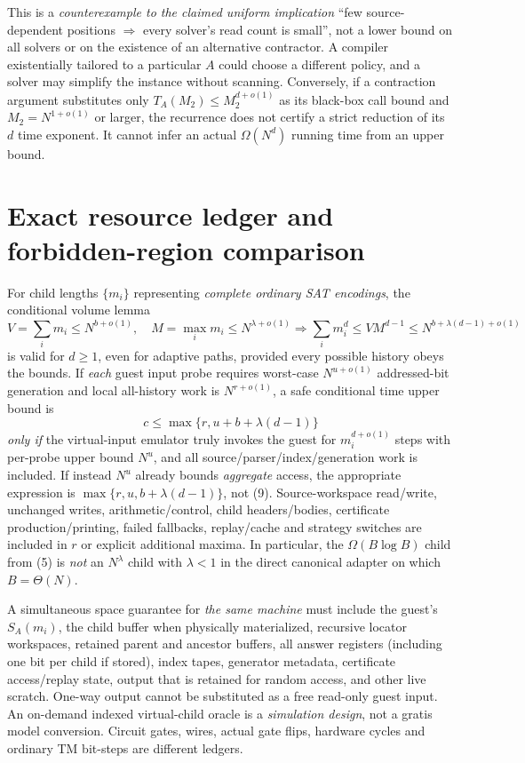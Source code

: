 \documentclass[11pt]{article}
\begin{document}
This is a \emph{counterexample to the claimed uniform implication} ``few source-dependent positions $\Longrightarrow$ every solver's read count is small'', not a lower bound on all solvers or on the existence of an alternative contractor. A compiler existentially tailored to a particular $A$ could choose a different policy, and a solver may simplify the instance without scanning. Conversely, if a contraction argument substitutes only $T_A(M_2)\le M_2^{d+o(1)}$ as its black-box call bound and $M_2=N^{1+o(1)}$ or larger, the recurrence does not certify a strict reduction of its $d$ time exponent. It cannot infer an actual $\Omega(N^d)$ running time from an upper bound.

\section{Exact resource ledger and forbidden-region comparison}
For child lengths $\{m_i\}$ representing \emph{complete ordinary SAT encodings}, the conditional volume lemma
\[
V=\sum_i m_i\le N^{b+o(1)},\quad M=\max_i m_i\le N^{\lambda+o(1)}
\Longrightarrow\sum_i m_i^d\le VM^{d-1}\le N^{b+\lambda(d-1)+o(1)}\tag{8}
\]
is valid for $d\ge1$, even for adaptive paths, provided every possible history obeys the bounds. If \emph{each} guest input probe requires worst-case $N^{u+o(1)}$ addressed-bit generation and local all-history work is $N^{r+o(1)}$, a safe conditional time upper bound is
\[
 c\le\max\{r,u+b+\lambda(d-1)\}\tag{9}
\]
\emph{only if} the virtual-input emulator truly invokes the guest for $m_i^{d+o(1)}$ steps with per-probe upper bound $N^u$, and all source/parser/index/generation work is included. If instead $N^u$ already bounds \emph{aggregate} access, the appropriate expression is $\max\{r,u,b+\lambda(d-1)\}$, not (9). Source-workspace read/write, unchanged writes, arithmetic/control, child headers/bodies, certificate production/printing, failed fallbacks, replay/cache and strategy switches are included in $r$ or explicit additional maxima. In particular, the $\Omega(B\log B)$ child from (5) is \emph{not} an $N^{\lambda}$ child with $\lambda<1$ in the direct canonical adapter on which $B=\Theta(N)$.

A simultaneous space guarantee for \emph{the same machine} must include the guest's $S_A(m_i)$, the child buffer when physically materialized, recursive locator workspaces, retained parent and ancestor buffers, all answer registers (including one bit per child if stored), index tapes, generator metadata, certificate access/replay state, output that is retained for random access, and other live scratch. One-way output cannot be substituted as a free read-only guest input. An on-demand indexed virtual-child oracle is a \emph{simulation design}, not a gratis model conversion. Circuit gates, wires, actual gate flips, hardware cycles and ordinary TM bit-steps are different ledgers.
\end{document}
